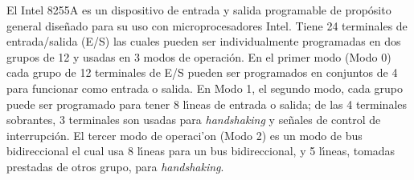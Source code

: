 El Intel 8255A es un dispositivo de entrada y salida programable de prop\'osito general %
dise\~nado para su uso con microprocesadores Intel. Tiene 24 terminales de entrada/salida (E/S) %
las cuales pueden ser individualmente programadas en dos grupos de 12 y usadas en 3 modos de %
operaci\'on. En el primer modo (Modo 0) cada grupo de 12 terminales de E/S pueden ser programados %
en conjuntos de 4 para funcionar como entrada o salida. En Modo 1, el segundo modo, cada grupo %
puede ser programado para tener 8 l\'{\i}neas de entrada o salida; de las 4 terminales %
sobrantes, 3 terminales son usadas para {\it handshaking\/} y se\~nales de control de %
interrupci\'on. El tercer modo de operaci\degree'on (Modo 2) es un modo de bus bidireccional el cual %
usa 8 l\'{\i}neas para un bus bidireccional, y 5 l\'{\i}neas, tomadas prestadas de otros %
grupo, para {\it handshaking\/}.


\cleardoublepage

~

\cleardoublepage

~

\cleardoublepage

~

\cleardoublepage

~

\cleardoublepage

~

\cleardoublepage

~

\cleardoublepage

~

\cleardoublepage

~

\cleardoublepage

